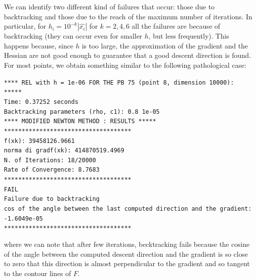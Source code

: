 We can identify two different kind of failures that occur: those due to backtracking and those due to the reach of the maximum number of iterations.
In particular, for $h_i=10^{-k}|\hat{x_i}|$ for $k=2,4,6$ all the failures are because of backtracking (they can occur even for smaller $h$, but less frequently). 
This happens because, since $h$ is too large, the approximation 
of the gradient and the Hessian are not good enough to guarantee that a good descent direction is found. For 
most points, we obtain something similar to the following pathological case:
\begin{list}{}{\setlength{\leftmargin}{0.7cm}}
    \item \texttt{**** REL with h = 1e-06 FOR THE PB 75 (point 8, dimension 10000):  ***** \\
    Time: 0.37252 seconds \\
    Backtracking parameters (rho, c1): 0.8 1e-05 \\
    **** MODIFIED NEWTON METHOD : RESULTS ***** \\
    ************************************ \\
    f(xk): 39458126.9661 \\
    norma di gradf(xk): 414870519.4969 \\
    N. of Iterations: 18/20000 \\
    Rate of Convergence: 8.7683 \\
    ************************************ \\
    FAIL \\
    Failure due to backtracking \\
    cos of the angle between the last computed direction and the gradient: -1.6049e-05 \\
    ************************************
    }
\end{list}
where we can note that after few iterations, becktracking fails because the cosine of the angle between the computed descent direction
and the gradient is so close to zero that this direction is almost perpendicular to the gradient and so tangent to the contour lines of $F$.

